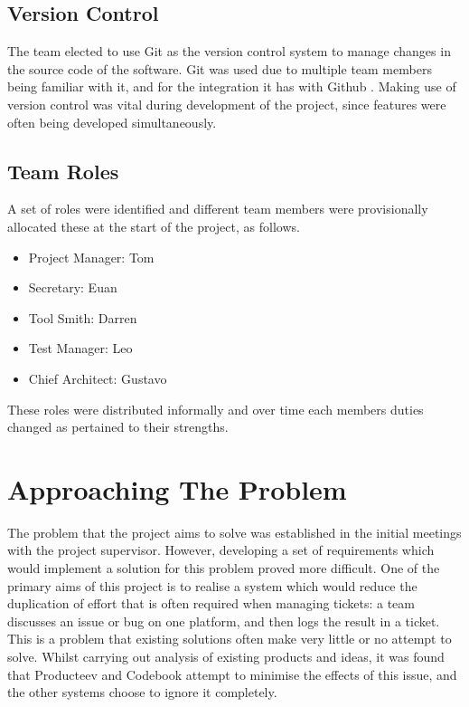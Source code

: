 \documentclass[a4paper]{l3proj}
\begin{document}
\subsection{Version Control}
\label{version}

The team elected to use Git \cite{site:github} as the version control system to manage changes in the source code of the software. Git was used due to multiple team members being familiar with it, and for the integration it has with Github \cite{site:ourGithub}. Making use of version control was vital during development of the project, since features were often being developed simultaneously.


\subsection{Team Roles}
\label{roles}

A set of roles were identified and different team members were provisionally allocated these at the start of the project, as follows.

\begin{itemize}
\item Project Manager: Tom
\item Secretary: Euan
\item Tool Smith: Darren
\item Test Manager: Leo
\item Chief Architect: Gustavo
\end{itemize}

These roles were distributed informally and over time each members duties changed as pertained to their strengths.

\section{Approaching The Problem}
\label{requirements}

The problem that the project aims to solve was established in the initial meetings with the project supervisor. However, developing a set of requirements which would implement a solution for this problem proved more difficult. One of the primary aims of this project is to realise a system which would reduce the duplication of effort that is often required when managing tickets: a team discusses an issue or bug on one platform, and then logs the result in a ticket. This is a problem that existing solutions often make very little or no attempt to solve. Whilst carrying out analysis of existing products and ideas, it was found that Producteev and Codebook attempt to minimise the effects of this issue, and the other systems choose to ignore it completely.
\end{document}
